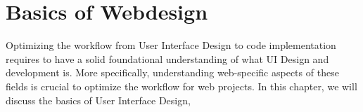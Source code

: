 \newpage
\section{Basics of Webdesign}
Optimizing the workflow from User Interface Design to code implementation requires to have a solid
foundational understanding of what UI Design and development is. More specifically, understanding
web-specific aspects of these fields is crucial to optimize the workflow for web projects. In this
chapter, we will discuss the basics of User Interface Design,





